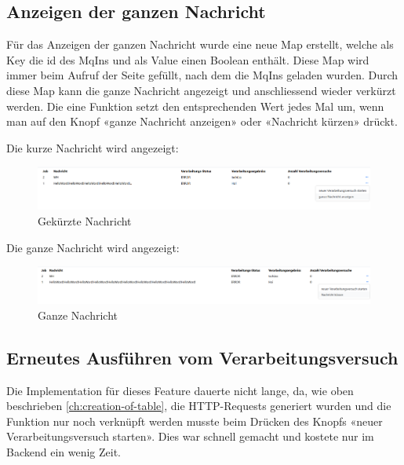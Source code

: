 \subsection{Anzeigen der ganzen Nachricht}
Für das Anzeigen der ganzen Nachricht wurde eine neue Map erstellt, welche als Key die id des MqIns und als Value einen Boolean enthält. Diese Map wird immer beim Aufruf der Seite gefüllt, nach dem die MqIns geladen wurden. Durch diese Map kann die ganze Nachricht angezeigt und anschliessend wieder verkürzt werden. Die eine Funktion setzt den entsprechenden Wert jedes Mal um, wenn man auf den Knopf «ganze Nachricht anzeigen» oder «Nachricht kürzen» drückt.

\noindent Die kurze Nachricht wird angezeigt:
\begin{figure}[H]
	\begin{center}
		\includegraphics[width=1\textwidth]{ressourcen/Kurze-Nachricht}
		\caption[Gekürzte Nachricht]{Gekürzte Nachricht}\label{fig:show-shortend-version-of-message}
	\end{center}
\end{figure}

\noindent Die ganze Nachricht wird angezeigt:
\begin{figure}[H]
	\begin{center}
		\includegraphics[width=1\textwidth]{ressourcen/Ganze-Nachricht}
		\caption[Ganze Nachricht]{Ganze Nachricht}\label{fig:show-hole-message}
	\end{center}
\end{figure}

\subsection{Erneutes Ausführen vom Verarbeitungsversuch}
Die Implementation für dieses Feature dauerte nicht lange, da, wie oben beschrieben \ref{ch:creation-of-table}, die HTTP-Requests generiert wurden und die Funktion nur noch verknüpft werden musste beim Drücken des Knopfs «neuer Verarbeitungsversuch starten». Dies war schnell gemacht und kostete nur im Backend ein wenig Zeit.

